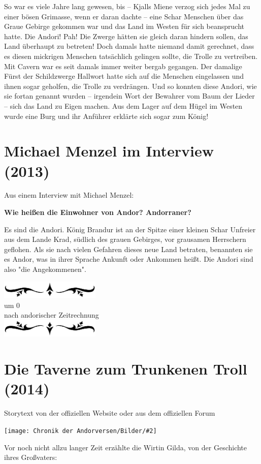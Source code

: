 \documentclass[10pt, a4paper, oneside]{book}
\newcommand{\fillbreak}{\vspace*{\fill}\columnbreak}
\newcommand{\storytext}[1]{%
    \section{#1}%
    \label{Storytext: #1}%
}
\newcommand{\bildmitts}[2][height=0.32\textwidth,width=0.48\textwidth,keepaspectratio]{%
    \begin{center}
        \texttt{[image: Chronik der Andorversen/Bilder/\#2]}
    \end{center}
}
\newcommand{\az}[1]{%
    \begin{center}
        \includegraphics[width=180px]{Chronik der Andorversen/verzierung1.png}\\
        {\Huge #1} \\
        {nach andorischer Zeitrechnung}\\
        \includegraphics[width=180px]{Chronik der Andorversen/verzierung2.png}
    \end{center}
    \extramarks{}{#1 a.Z.}
}
\begin{document}
\begin{multicols}{2}
So war es viele Jahre lang gewesen, bis – Kjalls Miene verzog sich jedes Mal zu einer bösen Grimasse, wenn er daran dachte – eine Schar Menschen über das Graue Gebirge gekommen war und das Land im Westen für sich beansprucht hatte. Die Andori! Pah! Die Zwerge hätten sie gleich daran hindern sollen, das Land überhaupt zu betreten! Doch damals hatte niemand damit gerechnet, dass es diesen mickrigen Menschen tatsächlich gelingen sollte, die Trolle zu vertreiben. Mit Cavern war es seit damals immer weiter bergab gegangen. Der damalige Fürst der Schildzwerge Hallwort hatte sich auf die Menschen eingelassen und ihnen sogar geholfen, die Trolle zu verdrängen. Und so konnten diese Andori, wie sie fortan genannt wurden – irgendein Wort der Bewahrer vom Baum der Lieder – sich das Land zu Eigen machen. Aus dem Lager auf dem Hügel im Westen wurde eine Burg und ihr Anführer erklärte sich sogar zum König!\bigskip

\fillbreak
\storytext{Michael Menzel im Interview (2013)}

\begin{center}
    Aus einem Interview mit Michael Menzel:
\end{center}

\textbf{Wie heißen die Einwohner von Andor? Andorraner?}

Es sind die Andori. König Brandur ist an der Spitze einer kleinen Schar Unfreier aus dem Lande Krad, südlich des grauen Gebirges, vor grausamen Herrschern geflohen. Als sie nach vielen Gefahren dieses neue Land betraten, benannten sie es Andor, was in ihrer Sprache Ankunft oder Ankommen heißt. Die Andori sind also "die Angekommenen".



\fillbreak
\az{um 0}



\storytext{Die Taverne zum Trunkenen Troll (2014)}

\begin{center}
    Storytext von der offiziellen Website oder aus dem offiziellen Forum
\end{center}

\bildmitts{Die Taverne zum Trunkenen Troll Bild 1.jpg}

Vor noch nicht allzu langer Zeit erzählte die Wirtin Gilda, von der Geschichte ihres Großvaters:


\end{multicols}
\end{document}
